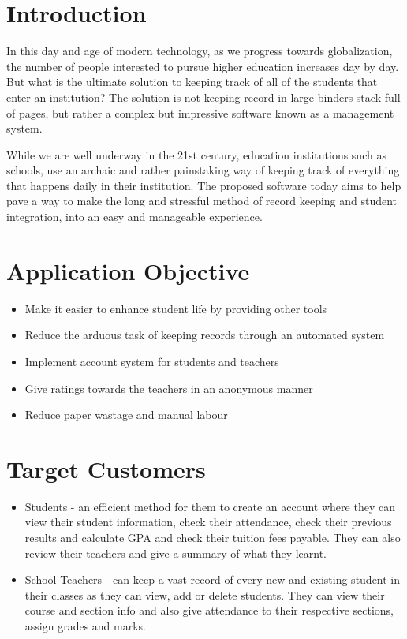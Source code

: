 \documentclass[a4paper,12pt]{article}
\begin{document}
\newpage


\section{Introduction}
\enlargethispage{\baselineskip}
In this day and age of modern technology, as we progress towards globalization, the number of people interested to pursue higher education increases day by day. But what is the ultimate solution to keeping track of all of the students that enter an institution? The solution is not keeping record in large binders stack full of pages, but rather a complex but impressive software known as a management system. \par While we are well underway in the 21st century, education institutions such as schools, use an archaic and rather painstaking way of keeping track of everything that happens daily in their institution. The proposed software today aims to help pave a way to make the long and stressful method of record keeping and student integration, into an easy and manageable experience. 

\section{Application Objective}
\enlargethispage{\baselineskip}
\begin{itemize}
    \item Make it easier to enhance student life by providing other tools
    \item Reduce the arduous task of keeping records through an automated system
    \item Implement account system for students and teachers
    \item Give ratings towards the teachers in an anonymous manner
    \item Reduce paper wastage and manual labour
\end{itemize}

\section{Target Customers}
\enlargethispage{\baselineskip}
\begin{itemize}
    \item Students  -  an efficient method for them to create an account where they can view their student information, check their attendance, check their previous results and calculate GPA and check their tuition fees payable. They can also review their teachers and give a summary of what they learnt.
    \item School Teachers - can keep a vast record of every new and existing student in their classes as they can view, add or delete students. They can view their course and section info and also give attendance to their respective sections, assign grades and marks.  
    
\end{itemize}
\pagebreak
\end{document}
